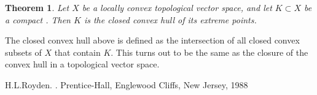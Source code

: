 \documentclass[12pt]{article}
\theoremstyle{theorem}
\newtheorem*{thm}{Theorem}
\theoremstyle{definition}
\begin{document}
\begin{thm}
Let $X$ be a locally convex topological vector space, and let $K \subset X$
be a compact .  Then $K$ is the closed convex hull of its extreme points.
\end{thm}

The closed convex hull above is defined as the intersection of all closed convex subsets of $X$ that contain $K$.  This turns out to be the same as the closure of the convex hull in a topological vector space.
                                                                                
\begin{thebibliography}{9}
H.\@ L.\@ Royden. \emph{}. Prentice-Hall, Englewood Cliffs, New Jersey, 1988
\end{thebibliography}
\end{document}
